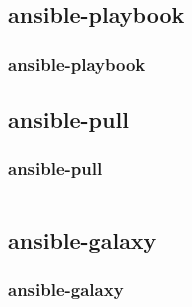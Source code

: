\documentclass{beamer}
\begin{document}
\subsection{ansible-playbook}

\begin{frame}
    \frametitle{ansible-playbook}

\end{frame}

\subsection{ansible-pull}

\begin{frame}[fragile]
    \frametitle{ansible-pull}
    \tiny{
        \inputminted{shell}{sources/ansible_pull.yml}
    }
\end{frame}

\subsection{ansible-galaxy}

\begin{frame}
    \frametitle{ansible-galaxy}

\end{frame}
\end{document}
